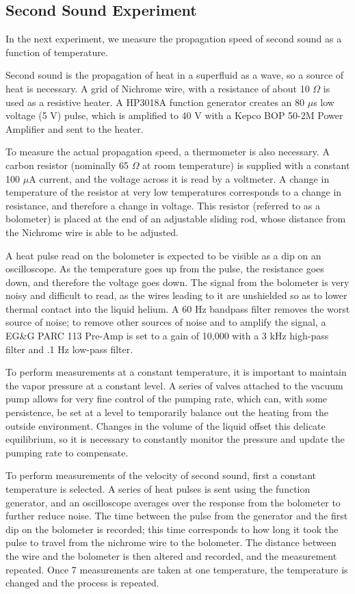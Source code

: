 \subsection{Second Sound Experiment}

In the next experiment, we measure the propagation speed of second sound as a function of temperature.

Second sound is the propagation of heat in a superfluid as a wave, so a source of heat is necessary. A grid of Nichrome wire, with a resistance of about 10 $\Omega$ is used as a resistive heater. A HP3018A function generator creates an 80 $\mu$s low voltage (5 V) pulse, which is amplified to 40 V with a Kepco BOP 50-2M Power Amplifier and sent to the heater. 

To measure the actual propagation speed, a thermometer is also necessary. A carbon resistor (nominally 65 $\Omega$ at room temperature) is supplied with a constant 100 $\mu$A current, and the voltage across it is read by a voltmeter. A change in temperature of the resistor at very low temperatures corresponds to a change in resistance, and therefore a change in voltage. This resistor (referred to as a bolometer) is placed at the end of an adjustable sliding rod, whose distance from the Nichrome wire is able to be adjusted.

A heat pulse read on the bolometer is expected to be visible as a dip on an oscilloscope. As the temperature goes up from the pulse, the resistance goes down, and therefore the voltage goes down. The signal from the bolometer is very noisy and difficult to read, as the wires leading to it are unshielded so as to lower thermal contact into the liquid helium. A 60 Hz bandpass filter removes the worst source of noise; to remove other sources of noise and to amplify the signal, a EG\&G PARC 113 Pre-Amp is set to a gain of 10,000 with a 3 kHz high-pass filter and .1 Hz low-pass filter.

To perform measurements at a constant temperature, it is important to maintain the vapor pressure at a constant level. A series of valves attached to the vacuum pump allows for very fine control of the pumping rate, which can, with some persistence, be set at a level to temporarily balance out the heating from the outside environment. Changes in the volume of the liquid offset this delicate equilibrium, so it is necessary to constantly monitor the pressure and update the pumping rate to compensate.

To perform measurements of the velocity of second sound, first a constant temperature is selected. A series of heat pulses is sent using the function generator, and an oscilloscope averages over the response from the bolometer to further reduce noise. The time between the pulse from the generator and the first dip on the bolometer is recorded; this time corresponds to how long it took the pulse to travel from the nichrome wire to the bolometer. The distance between the wire and the bolometer is then altered and recorded, and the measurement repeated. Once 7 measurements are taken at one temperature, the temperature is changed and the process is repeated.

